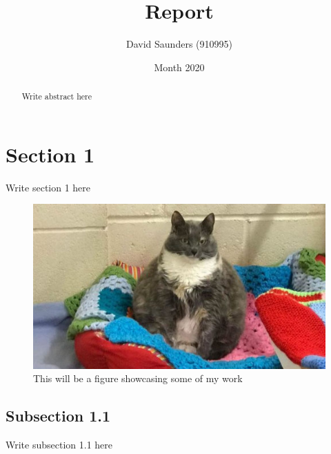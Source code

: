 \documentclass{article}
\title{Report}
\author{David Saunders (910995)}
\date{Month 2020}
\begin{document}
\maketitle

\begin{abstract} 
    Write abstract here
\end{abstract}

\tableofcontents

\section{Section 1}

Write section 1 here \cite{torsney2011tuner}

\begin{figure}[ht]
    \centering
    \includegraphics[scale=0.35]{Test.JPG}
    \caption{This will be a figure showcasing some of my work}
\end{figure}


\subsection{Subsection 1.1}
    Write subsection 1.1 here \cite{wikiChonker}

\printbibliography
\end{document}
